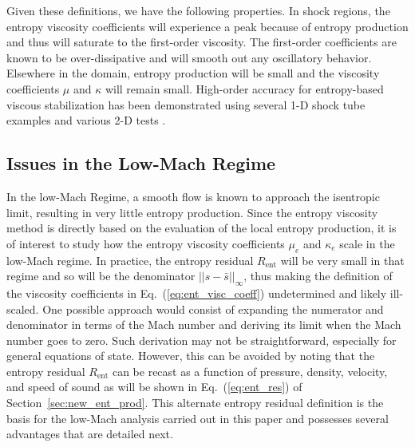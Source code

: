 \documentclass[preprint,10pt]{elsarticle}
\newcommand{\resi}{R_\text{ent}}
\newcommand{\eqt}[1]{Eq.~(\ref{#1})}                     %
\newcommand{\sct}[1]{Section~\ref{#1}}                   %
\begin{document}
%
Given these definitions, we have the following properties.
In shock regions, the entropy viscosity coefficients will experience a peak because of entropy production and thus 
will saturate to the first-order viscosity. The first-order coefficients are known to be over-dissipative and will 
smooth out any oscillatory behavior. Elsewhere in the domain, entropy production will be small and the viscosity 
coefficients $\mu$ and $\kappa$ will remain small. %
High-order accuracy for entropy-based viscous stabilization has been demonstrated using several 1-D shock tube 
examples and various 2-D tests \cite{jlg1, jlg2, valentin}.

\subsection{Issues in the Low-Mach Regime} 

In the low-Mach Regime, a smooth flow is known to approach the isentropic limit, resulting in very little 
entropy production. Since the entropy viscosity method is directly based on the evaluation of the 
local entropy production, it is of interest to study how the entropy viscosity coefficients $\mu_e$ 
and $\kappa_e$ scale in the low-Mach regime. In practice, the entropy residual $\resi$ will be very 
small in that regime and so will be the denominator $|| s - \bar{s} ||_\infty$, thus making the 
definition of the viscosity coefficients in \eqt{eq:ent_visc_coeff} undetermined and likely ill-scaled.  
One possible approach would consist of expanding the numerator and denominator in terms of the Mach number 
and deriving its limit when the Mach number goes to zero. Such derivation may not be straightforward, 
especially for general equations of state. However, this can be avoided by noting that the entropy 
residual $\resi$ can be recast as a function of pressure, density, velocity, and speed of sound as 
will be shown in \eqt{eq:ent_res} of \sct{sec:new_ent_prod}. This alternate entropy residual definition 
is the basis for the low-Mach analysis carried out in this paper and possesses several advantages that 
are detailed next. %

\end{document}
